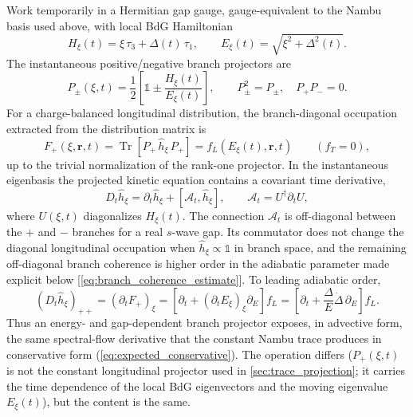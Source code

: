 \documentclass[
  aps,
  prb,
  preprint,
  superscriptaddress,
  longbibliography,
  nofootinbib
]{revtex4-2}
\newcommand{\Tr}{\operatorname{Tr}}
\newcommand{\br}{\mathbf{r}}
\newcommand{\fL}{f_L}
\newcommand{\fT}{f_T}
\providecommand{\openone}{}\renewcommand{\openone}{\mathds{1}}
\begin{document}
Work temporarily in a Hermitian gap gauge, gauge-equivalent to the Nambu basis
used above, with local BdG Hamiltonian
\begin{equation}
  H_\xi(t)=\xi\,\tau_3+\Delta(t)\,\tau_1,
  \qquad
  E_\xi(t)=\sqrt{\xi^2+\Delta^2(t)} .
  \label{eq:bdg_branch_hamiltonian}
\end{equation}
The instantaneous positive/negative branch projectors are
\begin{equation}
  P_\pm(\xi,t)
  =
  \frac{1}{2}
  \left[
    \openone
    \pm
    \frac{H_\xi(t)}{E_\xi(t)}
  \right],
  \qquad
  P_\pm^2=P_\pm,\quad P_+P_-=0 .
  \label{eq:bdg_branch_projectors}
\end{equation}
For a charge-balanced longitudinal distribution, the branch-diagonal
occupation extracted from the distribution matrix is
\begin{equation}
  F_+(\xi,\br,t)
  =
  \Tr\!\left[P_+\,\hat h_\xi\,P_+\right]
  =
  \fL(E_\xi(t),\br,t)
  \qquad(\fT=0),
  \label{eq:branch_projected_fL}
\end{equation}
up to the trivial normalization of the rank-one projector. In the
instantaneous eigenbasis the projected kinetic equation contains a covariant
time derivative,
\begin{equation}
  D_t \hat h_\xi
  =
  \partial_t \hat h_\xi
  +[\mathcal A_t,\hat h_\xi],
  \qquad
  \mathcal A_t=U^\dagger\partial_t U ,
  \label{eq:branch_covariant_derivative}
\end{equation}
where \(U(\xi,t)\) diagonalizes \(H_\xi(t)\). The connection
\(\mathcal A_t\) is off-diagonal between the \(+\) and \(-\) branches for a
real \(s\)-wave gap. Its commutator does not change the diagonal longitudinal
occupation when \(\hat h_\xi\propto\openone\) in branch space, and the
remaining off-diagonal branch coherence is higher order in the adiabatic
parameter made explicit below [\cref{eq:branch_coherence_estimate}]. To
leading adiabatic order,
\begin{equation}
  (D_t \hat h_\xi)_{++}
  =
  \left(\partial_t F_+\right)_\xi
  =
  \left[
    \partial_t
    +\left(\partial_t E_\xi\right)_\xi\partial_E
  \right]\fL
  =
  \left[
    \partial_t
    +\frac{\Delta}{E}\dot\Delta\,\partial_E
  \right]\fL .
  \label{eq:branch_projector_spectral_flow}
\end{equation}
Thus an energy- and gap-dependent branch projector exposes, in advective
form, the same spectral-flow derivative that the constant Nambu trace
produces in conservative form (\cref{eq:expected_conservative}). The
operation differs (\(P_+(\xi,t)\) is not the constant longitudinal
projector used in \cref{sec:trace_projection}; it carries the time
dependence of the local BdG eigenvectors and the moving eigenvalue
\(E_\xi(t)\)), but the content is the same.
\end{document}
